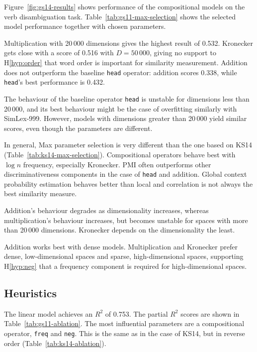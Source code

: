 Figure~\ref{fig:gs14-results} shows performance of the compositional models on the verb disambiguation task. Table~\ref{tab:gs11-max-selection} shows the selected model performance together with chosen parameters.

Multiplication with 20\,000 dimensions gives the highest result of 0.532. Kronecker gets close with a score of 0.516 with $D = 50\,000$, giving no support to H\ref{hyp:order} that word order is important for similarity measurement. Addition does not outperform the baseline \texttt{head} operator: addition scores 0.338, while \texttt{head}'s best performance is 0.432.

The behaviour of the baseline operator \texttt{head} is unstable for dimensions less than 20\,000, and its best behaviour might be the case of overfitting similarly with SimLex-999. However, models with dimensions greater than 20\,000 yield similar scores, even though the parameters are different.

In general, Max parameter selection is very different than the one based on KS14 (Table~\ref{tab:ks14-max-selection}). Compositional operators behave best with $\log n$ frequency, especially Kronecker. PMI often outperforms other discriminativeness components in the case of \texttt{head} and addition. Global context probability estimation behaves better than local and correlation is not always the best similarity measure.

Addition's behaviour degrades as dimensionality increases, whereas multiplication's behaviour increases, but becomes unstable for spaces with more than 20\,000 dimensions. Kronecker depends on the dimensionality the least.

Addition works best with dense models. Multiplication and Kronecker prefer dense, low-dimensional spaces and sparse, high-dimensional spaces, supporting H\ref{hyp:neg} that a frequency component is required for high-dimensional spaces.

\subsection{Heuristics}
\label{sec:heuristics-gs11}

The linear model achieves an $R^2$ of 0.753. The partial $R^2$ scores are shown in Table~\ref{tab:gs11-ablation}. The most influential parameters are a compositional operator, \texttt{freq} and \texttt{neg}. This is the same as in the case of KS14, but in reverse order (Table~\ref{tab:ks14-ablation}).

